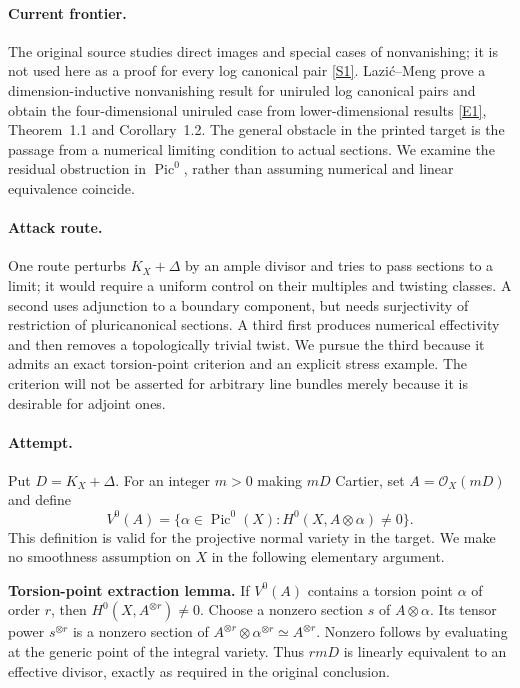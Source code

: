 \documentclass[11pt,a4paper]{article}
\newcommand{\sref}[2]{\hyperlink{source:#1:#2}{[S#2]}}
\newcommand{\eref}[2]{\hyperlink{extra:#1:#2}{[E#2]}}
\numberwithin{equation}{section}
\begin{document}
\paragraph{Current frontier.}
The original source studies direct images and special cases of nonvanishing; it is not used here as a proof for every log canonical pair \sref{194}{1}. Lazi\'c--Meng prove a dimension-inductive nonvanishing result for uniruled log canonical pairs and obtain the four-dimensional uniruled case from lower-dimensional results \eref{194}{1}, Theorem~1.1 and Corollary~1.2. The general obstacle in the printed target is the passage from a numerical limiting condition to actual sections. We examine the residual obstruction in $\operatorname{Pic}^0$, rather than assuming numerical and linear equivalence coincide.

\paragraph{Attack route.}
One route perturbs $K_X+\Delta$ by an ample divisor and tries to pass sections to a limit; it would require a uniform control on their multiples and twisting classes. A second uses adjunction to a boundary component, but needs surjectivity of restriction of pluricanonical sections. A third first produces numerical effectivity and then removes a topologically trivial twist. We pursue the third because it admits an exact torsion-point criterion and an explicit stress example. The criterion will not be asserted for arbitrary line bundles merely because it is desirable for adjoint ones.

\paragraph{Attempt.}
Put $D=K_X+\Delta$. For an integer $m>0$ making $mD$ Cartier, set $A=\mathcal O_X(mD)$ and define
\[
 V^0(A)=\{\alpha\in\operatorname{Pic}^0(X):H^0(X,A\otimes\alpha)\ne0\}.
\]
This definition is valid for the projective normal variety in the target. We make no smoothness assumption on $X$ in the following elementary argument.

\textbf{Torsion-point extraction lemma.} If $V^0(A)$ contains a torsion point $\alpha$ of order $r$, then $H^0(X,A^{\otimes r})\ne0$.
Choose a nonzero section $s$ of $A\otimes\alpha$. Its tensor power $s^{\otimes r}$ is a nonzero section of $A^{\otimes r}\otimes\alpha^{\otimes r}\simeq A^{\otimes r}$. Nonzero follows by evaluating at the generic point of the integral variety. Thus $rmD$ is linearly equivalent to an effective divisor, exactly as required in the original conclusion.
\end{document}
